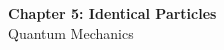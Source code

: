 \documentclass[12pt]{article}
\begin{document}
\begin{center}
  {\LARGE\bfseries Chapter 5: Identical Particles}\\[0.25em]
  {\large Quantum Mechanics}\\[0.15em]
\end{center}
\end{document}
